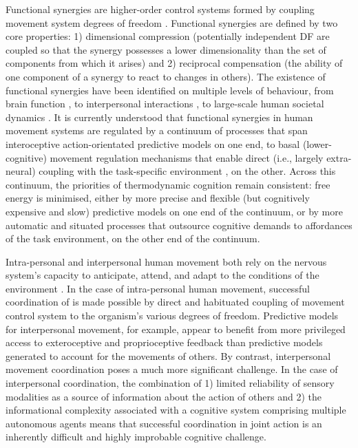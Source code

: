 \begin{CJK}{UTF8}{gbsn}
Functional synergies are higher-order control systems formed by coupling movement system degrees of freedom \citep{Turvey1978}.  Functional synergies are defined by two core properties:  1) dimensional compression (potentially independent DF are coupled so that the synergy possesses a lower dimensionality than the set of components from which it arises) and 2) reciprocal compensation (the ability of one component of a synergy to react to changes in others).
The existence of functional synergies have been identified on multiple levels of behaviour, from brain function \citep{Yufik1998,Sengupta2013}, to interpersonal interactions \citep{Kelso2009,Riley2011,Fusaroli2014}, to large-scale human societal dynamics \citep{Nowak2017}.  It is currently understood that functional synergies in human movement systems are regulated by a continuum of processes that span interoceptive action-orientated predictive models on one end, to  basal (lower-cognitive) movement regulation mechanisms that enable direct (i.e., largely extra-neural) coupling with the task-specific environment \citep{Semin2012}, on the other.  Across this continuum, the priorities of thermodynamic cognition remain consistent: free energy is minimised, either by more precise and flexible (but cognitively expensive and slow) predictive models on one end of the continuum, or by more automatic and situated processes that outsource cognitive demands to affordances of the task environment, on the other end of the continuum.


Intra-personal and interpersonal human movement both rely on the nervous system’s capacity to anticipate, attend, and adapt to the conditions of the environment \citep{Keller2014}.  In the case of intra-personal human movement, successful coordination of is made possible by direct and habituated coupling of movement control system to the organism's various degrees of freedom.  Predictive models for interpersonal movement, for example, appear to benefit from more privileged access to exteroceptive and proprioceptive feedback than predictive models generated to account for the movements of others.  By contrast, interpersonal movement coordination poses a much more significant challenge.  In the case of interpersonal coordination, the combination of 1) limited reliability of sensory modalities as a source of information about the action of others \citep{Wilson2005,Wolpert2003,Frith2007} and 2) the informational complexity associated with a cognitive system comprising multiple autonomous agents \citep{Bernstein1967} means that successful coordination in joint action is an inherently difficult and highly improbable cognitive challenge.



\end{CJK}
